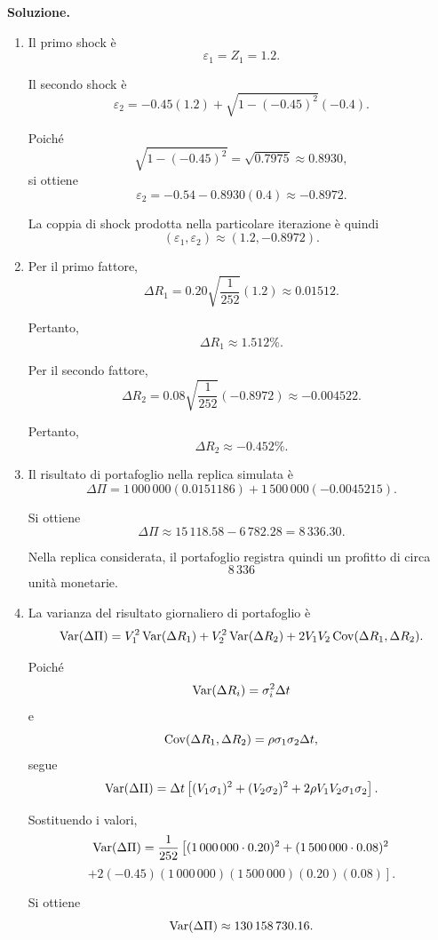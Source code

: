 \noindent
\textbf{Soluzione.}

\begin{enumerate}

\item Il primo shock \`{e}
\[
\varepsilon_1
=
Z_1
=
1.2.
\]

Il secondo shock \`{e}
\[
\varepsilon_2
=
-0.45(1.2)
+
\sqrt{1-(-0.45)^2}(-0.4).
\]

Poich\'{e}
\[
\sqrt{1-(-0.45)^2}
=
\sqrt{0.7975}
\approx
0.8930,
\]
si ottiene
\[
\varepsilon_2
=
-0.54-0.8930(0.4)
\approx
-0.8972.
\]

La coppia di shock prodotta nella particolare iterazione \`{e} quindi
\[
(\varepsilon_1,\varepsilon_2)
\approx
(1.2,-0.8972).
\]

\item Per il primo fattore,
\[
\Delta R_1
=
0.20
\sqrt{\frac{1}{252}}
(1.2)
\approx
0.01512.
\]

Pertanto,
\[
\Delta R_1\approx 1.512\%.
\]

Per il secondo fattore,
\[
\Delta R_2
=
0.08
\sqrt{\frac{1}{252}}
(-0.8972)
\approx
-0.004522.
\]

Pertanto,
\[
\Delta R_2\approx -0.452\%.
\]

\item Il risultato di portafoglio nella replica simulata \`{e}
\[
\Delta\Pi
=
1\,000\,000(0.0151186)
+
1\,500\,000(-0.0045215).
\]

Si ottiene
\[
\Delta\Pi
\approx
15\,118.58-6\,782.28
=
8\,336.30.
\]

Nella replica considerata, il portafoglio registra quindi un profitto
di circa
\[
8\,336
\]
unit\`{a} monetarie.

\item La varianza del risultato giornaliero di portafoglio \`{e}
\[
\operatorname{Var}(\Delta\Pi)
=
V_1^2\operatorname{Var}(\Delta R_1)
+
V_2^2\operatorname{Var}(\Delta R_2)
+
2V_1V_2\operatorname{Cov}(\Delta R_1,\Delta R_2).
\]

Poich\'{e}
\[
\operatorname{Var}(\Delta R_i)
=
\sigma_i^2\Delta t
\]
e
\[
\operatorname{Cov}(\Delta R_1,\Delta R_2)
=
\rho\sigma_1\sigma_2\Delta t,
\]
segue
\[
\operatorname{Var}(\Delta\Pi)
=
\Delta t
\left[
(V_1\sigma_1)^2
+
(V_2\sigma_2)^2
+
2\rho V_1V_2\sigma_1\sigma_2
\right].
\]

Sostituendo i valori,
\[
\operatorname{Var}(\Delta\Pi)
=
\frac{1}{252}
\left[
(1\,000\,000\cdot0.20)^2
+
(1\,500\,000\cdot0.08)^2
\right.
\]
\[
\left.
+
2(-0.45)
(1\,000\,000)
(1\,500\,000)
(0.20)
(0.08)
\right].
\]

Si ottiene
\[
\operatorname{Var}(\Delta\Pi)
\approx
130\,158\,730.16.
\]


\end{enumerate}
